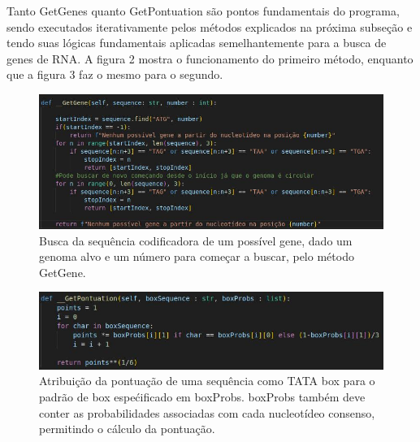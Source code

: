 \documentclass[brazilian,12pt,a4paper,final]{article}
\begin{document}
	\vspace{0.5cm}
	
	Tanto GetGenes quanto GetPontuation são pontos fundamentais do programa, sendo executados iterativamente pelos métodos explicados na próxima subseção e tendo suas lógicas fundamentais aplicadas semelhantemente para a busca de genes de RNA. A figura 2 mostra o funcionamento do primeiro método, enquanto que a figura 3 faz o mesmo para o segundo.
	
	\begin{figure}[hbtp]
		\begin{center}
			\includegraphics[width=15cm]{../Figures/GetGene.jpg}
			\caption{Busca da sequência codificadora de um possível gene, dado um genoma alvo e um número para começar a buscar, pelo método GetGene.}
			\label{fig}
		\end{center}
	\end{figure}

\begin{figure}[hbtp]
	\begin{center}
		\includegraphics[width=15cm]{../Figures/GetPontuation.jpg}
		\caption{Atribuição da pontuação de uma sequência como TATA box para o padrão de box espećificado em boxProbs. boxProbs também deve conter as probabilidades associadas com cada nucleotídeo consenso, permitindo o cálculo da pontuação.}
		\label{fig}
	\end{center}
\end{figure}
\end{document}
